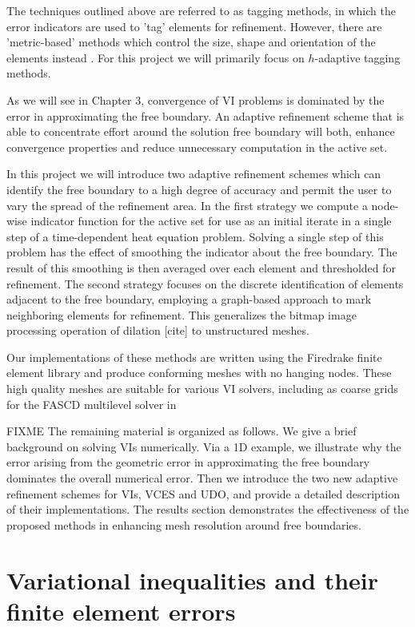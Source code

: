 \documentclass[]{interact}
\theoremstyle{plain}%
\theoremstyle{definition}
\theoremstyle{remark}
\begin{document}
The techniques outlined above are referred to as tagging methods, in which the error indicators are used to 'tag' elements for refinement. However, there are 'metric-based' methods which control the size, shape and orientation of the elements instead \citep{Alauzet2010}.  For this project we will primarily focus on $h$-adaptive tagging methods.

As we will see in Chapter 3, convergence of VI problems is dominated by the error in approximating the free boundary. An adaptive refinement scheme that is able to concentrate effort around the solution free boundary will both, enhance convergence properties and reduce unnecessary computation in the active set.


In this project we will introduce two adaptive refinement schemes which can identify the free boundary to a high degree of accuracy and permit the user to vary the spread of the refinement area. In the first strategy we compute a node-wise indicator function for the active set for use as an initial iterate in a single step of a time-dependent heat equation problem. Solving a single step of this problem has the effect of smoothing the indicator about the free boundary. The result of this smoothing is then averaged over each element and thresholded for refinement.  The second strategy focuses on the discrete identification of elements adjacent to the free boundary, employing a graph-based approach to mark neighboring elements for refinement.  This generalizes the bitmap image processing operation of dilation [cite] to unstructured meshes.

Our implementations of these methods are written using the Firedrake finite element library and produce conforming meshes with no hanging nodes. These high quality meshes are suitable for various VI solvers, including as coarse grids for the FASCD multilevel solver in \cite{BuelerFarrell2024}

FIXME The remaining material is organized as follows.  We give a brief background on solving VIs numerically.  Via a 1D example, we illustrate why the error arising from the geometric error in approximating the free boundary dominates the overall numerical error.   Then we introduce the two new adaptive refinement schemes for VIs, VCES and UDO, and provide a detailed description of their implementations.  The results section demonstrates the effectiveness of the proposed methods in enhancing mesh resolution around free boundaries. 


\section{Variational inequalities and their finite element errors} \label{sec:vifem}
\end{document}
